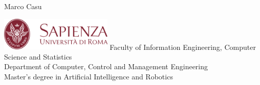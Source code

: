\documentclass[10pt, letterpaper]{report}
\title{\titolo} %
\author{Marco Casu}
\date{\vspace{-5ex}}
\begin{document}
\begin{titlepage}
    
\begin{center}
   \HUGE Marco Casu\acc
\end{center}
\thispagestyle{empty}
\begin{figure}[h]
\end{figure}
\vfill 
\centering \includegraphics[width=0.4\textwidth ]{preamble/Stemma_sapienza.png} \acc
\centering \Large \color{sapienza}Faculty of Information Engineering, Computer Science and Statistics\\
Department of Computer, Control and Management Engineering\\
Master's degree in Artificial Intelligence and Robotics
\end{titlepage}
\end{document}
